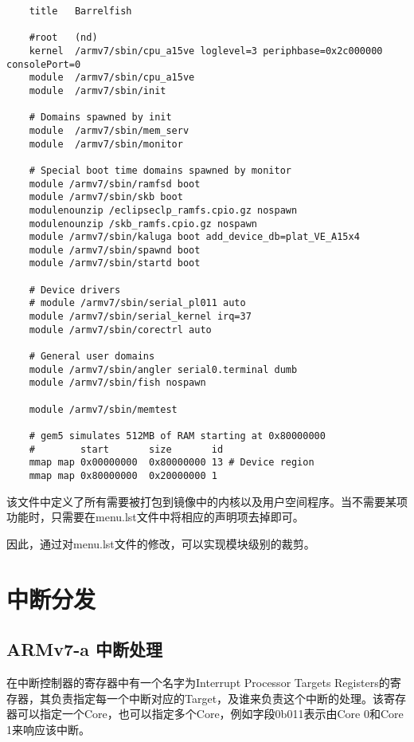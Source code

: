 \documentclass[a4paper, 12pt]{report}
\begin{document}
    \begin{lstlisting}
    title	Barrelfish

    #root	(nd)
    kernel	/armv7/sbin/cpu_a15ve loglevel=3 periphbase=0x2c000000 consolePort=0
    module	/armv7/sbin/cpu_a15ve
    module	/armv7/sbin/init
    
    # Domains spawned by init
    module	/armv7/sbin/mem_serv
    module	/armv7/sbin/monitor
    
    # Special boot time domains spawned by monitor
    module /armv7/sbin/ramfsd boot
    module /armv7/sbin/skb boot
    modulenounzip /eclipseclp_ramfs.cpio.gz nospawn
    modulenounzip /skb_ramfs.cpio.gz nospawn
    module /armv7/sbin/kaluga boot add_device_db=plat_VE_A15x4
    module /armv7/sbin/spawnd boot
    module /armv7/sbin/startd boot
    
    # Device drivers
    # module /armv7/sbin/serial_pl011 auto
    module /armv7/sbin/serial_kernel irq=37
    module /armv7/sbin/corectrl auto
    
    # General user domains
    module /armv7/sbin/angler serial0.terminal dumb
    module /armv7/sbin/fish nospawn
    
    module /armv7/sbin/memtest
    
    # gem5 simulates 512MB of RAM starting at 0x80000000
    #        start       size       id
    mmap map 0x00000000  0x80000000 13 # Device region
    mmap map 0x80000000  0x20000000 1
    \end{lstlisting}
    
    该文件中定义了所有需要被打包到镜像中的内核以及用户空间程序。当不需要某项功能时，只需要在menu.lst文件中将相应的声明项去掉即可。

    因此，通过对menu.lst文件的修改，可以实现模块级别的裁剪。
    
    \chapter{中断分发}
    
    \section{ARMv7-a 中断处理}
    
    在中断控制器的寄存器中有一个名字为Interrupt Processor Targets Registers的寄存器，其负责指定每一个中断对应的Target，及谁来负责这个中断的处理。该寄存器可以指定一个Core，也可以指定多个Core，例如字段0b011表示由Core 0和Core 1来响应该中断。
    
\end{document}
